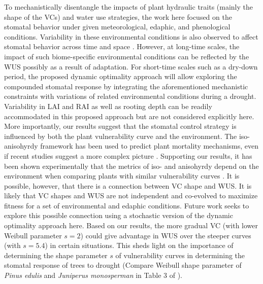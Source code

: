 \documentclass[utf8]{frontiersSCNS} %
\begin{document}
To mechanistically disentangle the impacts of plant hydraulic traits (mainly the shape of the VCs) and water use strategies, the work here focused on the stomatal behavior under given meteorological, edaphic, and phenological conditions. Variability in these environmental conditions is also observed to affect stomatal behavior across time and space \citep{feng2018beyond,novick2019beyond}. However, at long-time scales, the impact of such biome-specific environmental conditions can be reflected by the WUS possibly as a result of adaptation. For short-time scales such as a dry-down period, the proposed dynamic optimality approach will allow exploring the compounded stomatal response by integrating the aforementioned mechanistic constraints with variations of related environmental conditions during a drought. Variability in LAI and RAI as well as rooting depth can be readily accommodated in this proposed approach but are not considered explicitly here. More importantly, our results suggest that the stomatal control strategy is influenced by both the plant vulnerability curve and the environment. The iso-anisohyrdy framework has been used to predict plant mortality mechanisms, even if recent studies suggest a more complex picture \citep{meinzer_dynamics_2014,martinezvilalta_water_2017}. Supporting our results, it has been shown experimentally that the metrics of iso- and anisohyrdy depend on the environment when comparing plants with similar vulnerability curves \citep{hochberg_iso/anisohydry:_2018}. It is possible, however, that there is a connection between VC shape and WUS.  It is likely that VC shapes and WUS are not independent and co-evolved to maximize fitness for a set of environmental and edaphic conditions. Future work seeks to explore this possible connection using a stochastic version of the dynamic optimality approach here. Based on our results, the more gradual VC (with lower Weibull parameter $s=2$) could give advantage in WUS over the steeper curves (with $s=5.4$) in certain situations. This sheds light on the importance of determining the shape parameter $s$ of vulnerability curves in determining the stomatal response of trees to drought (Compare Weibull shape parameter of \textit{Pinus edulis} and \textit{Juniperus monosperman} in Table 3 of \citet{plaut_hydraulic_2012}).
\end{document}
